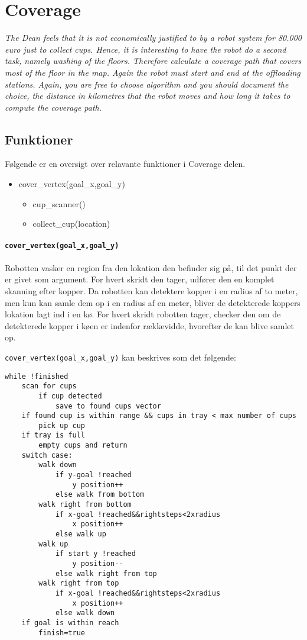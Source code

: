 \section{Coverage}
\label{sec:cov}
\textit{The Dean feels that it is not economically justified to by a robot system for 80.000 euro just to collect cups. Hence, it is interesting to have the robot do a second task, namely washing of the floors. Therefore calculate a coverage path that covers most of the floor in the map. Again the robot must start and end at the offloading stations.
Again, you are free to choose algorithm and you should document the choice, the distance in kilometres that the robot moves and how long it takes to compute the coverage path.}


\subsection{Funktioner}

Følgende er en oversigt over relavante funktioner i Coverage delen.

\begin{itemize}
	\item cover\_vertex(goal\_x,goal\_y)
	\begin{itemize}
		\item cup\_scanner()
		\item collect\_cup(location)
	\end{itemize}
	
\end{itemize}

\paragraph{\texttt{cover\_vertex(goal\_x,goal\_y)}}
Robotten vasker en region fra den lokation den befinder sig på, til det punkt der er givet som argument. For hvert skridt den tager, udfører den en komplet skanning efter kopper. Da robotten kan detektere kopper i en radius af to meter, men kun kan samle dem op i en radius af en meter, bliver de detekterede koppers lokation lagt ind i en kø. For hvert skridt robotten tager, checker den om de detekterede kopper i køen er indenfor rækkevidde, hvorefter de kan blive samlet op.

\texttt{cover\_vertex(goal\_x,goal\_y)} kan beskrives som det følgende:
\begin{lstlisting}
while !finished
	scan for cups
		if cup detected
			save to found cups vector
	if found cup is within range && cups in tray < max number of cups
		pick up cup
	if tray is full
		empty cups and return
	switch case:
		walk down 
			if y-goal !reached
				y position++
			else walk from bottom
		walk right from bottom 
			if x-goal !reached&&rightsteps<2xradius
				x position++
			else walk up
		walk up
			if start y !reached
				y position--
			else walk right from top
		walk right from top
			if x-goal !reached&&rightsteps<2xradius
				x position++
			else walk down
	if goal is within reach
		finish=true
\end{lstlisting}



